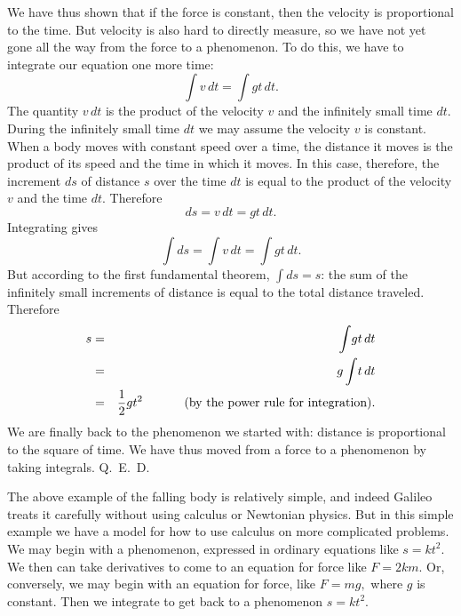 \documentclass[polutonikogreek,english,twoside,openright]{article}
\begin{document}
We have thus shown that if the force is constant, then the velocity is
proportional to the time.  But velocity is also hard to directly
measure, so we have not yet gone all the way from the force to a
phenomenon.  To do this, we have to integrate our equation one more
time:
$$\int\!v \,dt = \int\!gt\,dt.$$
The quantity $v\,dt$ is the product of the velocity $v$ and the infinitely small time $dt$.  During the infinitely small time $dt$ we may assume the velocity $v$ is constant.  When a body moves with constant speed over a time, the distance it moves is the product of its speed and the time in which it moves.  In this case, therefore, the increment $ds$ of distance $s$ over the time $dt$ is equal to the product of the velocity $v$ and the time $dt$.  Therefore
$$ds = v\,dt = gt\,dt.$$
Integrating gives
$$\int\!ds = \int\!v\,dt = \int\! gt\,dt.$$
But according to the first fundamental theorem, $\int\!ds = s$: the sum of the infinitely small increments of distance is equal to the total distance traveled.
Therefore
\begin{eqnarray*}
  s & = & \int \!gt\,dt\\
    & = & g\int\!t\,dt\\
    & = & \frac{1}{2}gt^2 \mbox{\hspace{3em} (by the power rule for integration).}
\end{eqnarray*}
We are finally back to the phenomenon we started with: distance is
proportional to the square of time.  We have thus moved from a force
to a phenomenon by taking integrals. Q.~E.~D.\vspace{2ex}

The above example of the falling body is relatively simple, and indeed
Galileo treats it carefully without using calculus or Newtonian
physics.  But in this simple example we have a model for how to use
calculus on more complicated problems.  We may begin with a
phenomenon, expressed in ordinary equations like $s = kt^2$.  We then
can take derivatives to come to an equation for force like $F = 2km$.
Or, conversely, we may begin with an equation for force, like $F= mg,$
where $g$ is constant.  Then we integrate to get back to a phenomenon
$s= kt^2$.\vspace{2ex}
\end{document}
